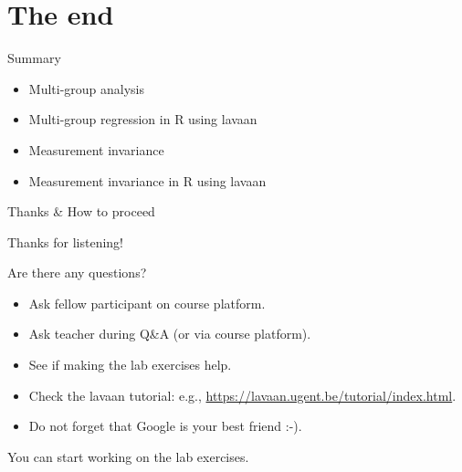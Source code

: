 \documentclass[10pt]{beamer}\usepackage[]{graphicx}\usepackage[]{xcolor}
\begin{document}
\section{The end}
%
%
\begin{frame}{Summary}

  \begin{itemize}
      \item Multi-group analysis
      \item Multi-group regression in R using lavaan
      \item Measurement invariance
      \item Measurement invariance in R using lavaan
  \end{itemize}

\end{frame}
%
\begin{frame}{Thanks \& How to proceed}

Thanks for listening!

\vspace*{5mm}

Are there any questions?\\
\begin{itemize}
  \item Ask fellow participant on course platform.
  \item Ask teacher during Q\&A (or via course platform).
  \item See if making the lab exercises help.
  \item Check the lavaan tutorial: e.g., \url{https://lavaan.ugent.be/tutorial/index.html}.
  \item Do not forget that Google is your best friend :-).
\end{itemize}

\vspace*{5mm}

You can start working on the lab exercises.

\end{frame}
%
%
\end{document}
